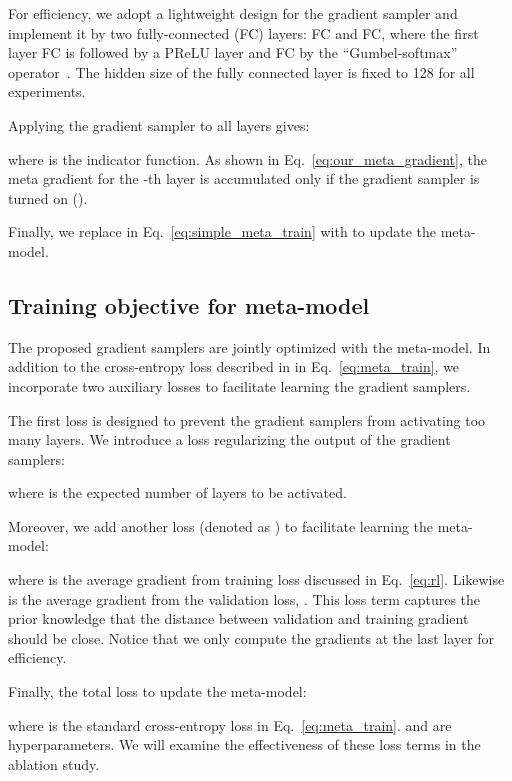 \documentclass[final]{cvpr}
\begin{document}
For efficiency, we adopt a lightweight design for the gradient sampler and implement it by two fully-connected (FC) layers: FC and FC, where the first layer FC is followed by a PReLU layer and FC by the ``Gumbel-softmax'' operator~\cite{jang2016categorical}. The hidden size of the fully connected layer is fixed to 128 for all experiments.


Applying the gradient sampler to all layers gives:
{\small

}where  is the indicator function.
As shown in Eq.~\eqref{eq:our_meta_gradient}, the meta gradient for the -th layer is accumulated only if the gradient sampler is turned on (\ie ).

Finally, we replace  in Eq.~\eqref{eq:simple_meta_train} with   to update the meta-model. 



\subsection{Training objective for meta-model}\label{sec:overall_objective}
The proposed gradient samplers are jointly optimized with the meta-model. In addition to the cross-entropy loss described in  in Eq.~\eqref{eq:meta_train}, we incorporate two auxiliary losses to facilitate learning the gradient samplers.

The first loss is designed to prevent the gradient samplers from activating too many layers. We introduce a loss  regularizing the output of the gradient samplers:

where  is the expected number of layers to be activated. 

Moreover, we add another loss (denoted as ) to facilitate learning the meta-model:

where  is the average gradient from training loss discussed in Eq.~\eqref{eq:rl}. Likewise  is the average gradient from the validation loss, \ie . This loss term  captures the prior knowledge that the distance between validation and training gradient should be close. Notice that we only compute the gradients at the last layer  for efficiency.


Finally, the total loss to update the meta-model:

where  is the standard cross-entropy loss in Eq.~\eqref{eq:meta_train}. 
 and  are hyperparameters. We will examine the effectiveness of these loss terms in the ablation study.

 
\end{document}

